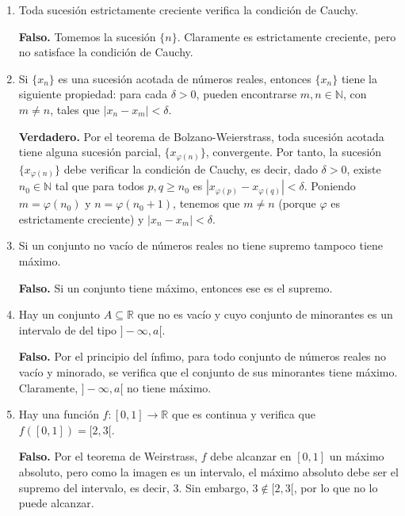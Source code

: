 \documentclass[10pt,a4paper]{article}
\begin{document}
\begin{enumerate}
		\item Toda sucesión estrictamente creciente verifica la condición de Cauchy.
		
		\textbf{Falso. }Tomemos la sucesión $\{n\}$. Claramente es estrictamente creciente, pero no satisface la condición de Cauchy. \newline
		
		\item Si $\{x_n\}$ es una sucesión acotada de números reales, entonces $\{x_n\}$ tiene la siguiente propiedad: para cada $\delta > 0$, pueden encontrarse $m, n \in \mathbb{N}$, con $m \neq n$, tales que $|x_n - x_m| < \delta$.
		
		\textbf{Verdadero.} Por el teorema de Bolzano-Weierstrass, toda sucesión acotada tiene alguna sucesión parcial, $\{x_{\varphi(n)}\}$, convergente. Por tanto, la sucesión $\{x_{\varphi(n)}\}$ debe verificar la condición de Cauchy, es decir, dado $\delta > 0$, existe $n_0 \in \mathbb{N}$ tal que para todos $p, q \geq n_0$ es $|x_{\varphi(p)} - x_{\varphi(q)}| < \delta$. Poniendo $m  = \varphi(n_0)$ y $n = \varphi(n_0 + 1)$, tenemos que $m \neq n$ (porque $\varphi$ es estrictamente creciente) y $|x_n - x_m| < \delta$. \newline
		
		\item Si un conjunto no vacío de números reales no tiene supremo tampoco tiene máximo.
		
		\textbf{Falso. }Si un conjunto tiene máximo, entonces ese es el supremo. \newline
		
		\item Hay un conjunto $A \subseteq \mathbb{R}$ que no es vacío y cuyo conjunto de minorantes es un intervalo de del tipo $]- \infty, a [$.
		
		\textbf{Falso. }Por el principio del ínfimo, para todo conjunto de números reales no vacío y minorado, se verifica que el conjunto de sus minorantes tiene máximo. Claramente, $]- \infty, a [$ no tiene máximo. \newline
		
		\item Hay una función $f : [0, 1] \rightarrow \mathbb{R}$ que es continua y verifica que $f([0, 1]) = [2, 3[$.
		
		\textbf{Falso. }Por el teorema de Weirstrass, $f$ debe alcanzar en $[0, 1]$ un máximo absoluto, pero como la imagen es un intervalo, el máximo absoluto debe ser el supremo del intervalo, es decir, $3$. Sin embargo, $3 \notin [2, 3[$, por lo que no lo puede alcanzar.\newline
		

\end{enumerate}
\end{document}
